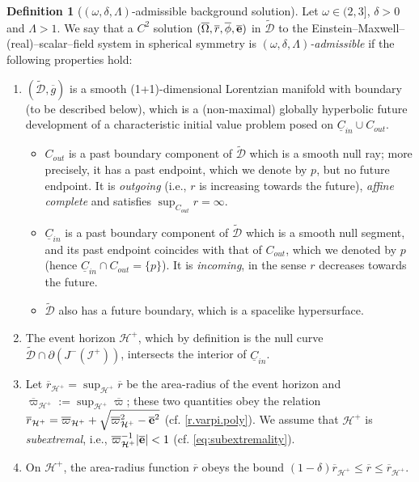 \documentclass[10pt, reqno]{amsart}
\theoremstyle{definition}
\newtheorem{definition}[theorem]{Definition}
\theoremstyle{remark}
\theoremstyle{conjecture}
\numberwithin{equation}{section}
\newcommand{\abs}[1]{\vert#1\vert}
\newcommand{\set}[1]{\{#1\}}
\newcommand{\rd}{\partial}
\newcommand{\0}{\emptyset}
\newcommand{\dlt}{\delta}
\newcommand{\Lmb}{\Lambda}
\newcommand{\omg}{\omega}
\newcommand{\Omg}{\Omega}
\newcommand{\bfe}{{\bf e}}
\newcommand{\calD}{\mathcal D}
\newcommand{\calH}{\mathcal H}
\newcommand{\calI}{\mathcal I}
\newcommand{\uC}{\underline{C}}
\newcommand{\EH}{\calH^{+}}
\newcommand{\e}{\bfe}							%
\newcommand{\NI}{\calI^{+}}						%
\newcommand{\gbg}{\overline{g}}					%
\newcommand{\Omgbg}{\overline{\Omg}}				%
\newcommand{\phibg}{\overline{\phi}}				%
\newcommand{\rbg}{\overline{r}}					%
\newcommand{\varpibg}{\overline{\varpi}}				%
\newcommand{\ebg}{\overline{\e}}					%
\begin{document}
\begin{definition} [$(\omg, \dlt, \Lambda)$-admissible background solution]\label{def:dlt-adm}
Let $\omg \in (2, 3]$, $\dlt > 0$ and $\Lmb > 1$. We say that a $C^{2}$ solution $(\Omgbg, \rbg, \phibg, \ebg)$ in $\widetilde{\calD}$ to the Einstein--Maxwell--(real)--scalar--field system in spherical symmetry is \emph{$(\omg, \dlt, \Lmb)$-admissible} if the following properties hold: 
\begin{enumerate}
\item $(\widetilde{\calD}, \gbg)$ is a smooth (1+1)-dimensional Lorentzian manifold with boundary (to be described below), which is a (non-maximal) globally hyperbolic future development of a characteristic initial value problem posed on $\uC_{in} \cup C_{out}$.
\begin{itemize}
\item $C_{out}$ is a past boundary component of $\widetilde{\calD}$ which is a smooth null ray; more precisely, it has a past endpoint, which we denote by $p$, but no future endpoint. It is \emph{outgoing} (i.e., $r$ is increasing towards the future), \emph{affine complete} and satisfies $\sup_{C_{out}} r = \infty$.
\item $\uC_{in}$ is a past boundary component of $\widetilde{\calD}$ which is a smooth null segment, and its past endpoint coincides with that of $C_{out}$, which we denoted by $p$ (hence $\uC_{in} \cap C_{out} = \set{p}$). It is \emph{incoming}, in the sense $r$ decreases towards the future.
\item $\widetilde{\calD}$ also has a future boundary, which is a spacelike hypersurface.
\end{itemize}
\item The event horizon $\EH$, which by definition is the null curve $\widetilde{\calD} \cap \rd (J^{-}(\NI))$, intersects the interior of $\uC_{in}$. 

\item Let $\rbg_{\EH} = \sup_{\EH} \rbg$ be the area-radius of the event horizon and $\varpibg_{\EH} := \sup_{\EH} \varpibg$; these two quantities obey the relation $\rbg_{\EH} = \varpibg_{\EH} + \sqrt{\varpibg_{\EH}^{2} - \ebg^{2}}$ (cf. \eqref{r.varpi.poly}). We assume that $\EH$ is \emph{subextremal}, i.e., $\varpibg_{\EH}^{-1} \abs{\ebg} < 1$ (cf. \eqref{eq:subextremality}).


\item On $\EH$, the area-radius function $\rbg$ obeys the bound $(1 -  \dlt) \rbg_{\EH} \leq \rbg \leq \rbg_{\EH}$. 


\end{enumerate}
\end{definition}
\end{document}
